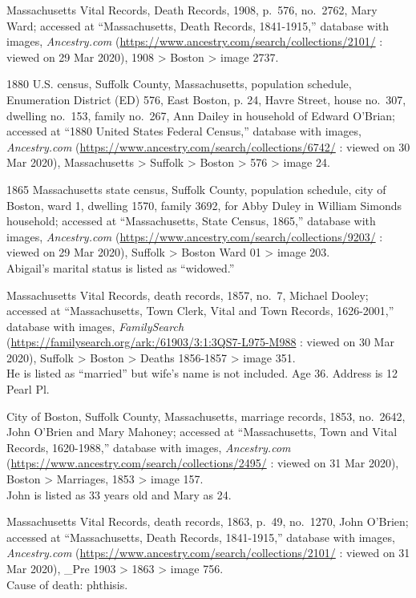 \begin{thebibliography}{999}
	Massachusetts Vital Records, Death Records, 1908, p.\ 576, no.\ 2762, Mary Ward; accessed at ``Massachusetts, Death Records, 1841-1915,'' database with images, \textit{Ancestry.com} (\url{https://www.ancestry.com/search/collections/2101/} : viewed on 29 Mar 2020), 1908 > Boston > image 2737.
	
	1880 U.S. census, Suffolk County, Massachusetts, population schedule, Enumeration District (ED) 576, East Boston, p. 24, Havre Street, house no.\ 307, dwelling no.\ 153, family no.\ 267, Ann Dailey in household of Edward O'Brian; accessed at ``1880 United States Federal Census,'' database with images, \textit{Ancestry.com} (\url{https://www.ancestry.com/search/collections/6742/} : viewed on 30 Mar 2020), Massachusetts > Suffolk > Boston > 576 > image 24.

	1865 Massachusetts state census, Suffolk County, population schedule, city of Boston, ward 1, dwelling 1570, family 3692, for Abby Duley in William Simonds household; accessed at ``Massachusetts, State Census, 1865,'' database with images, \textit{Ancestry.com} (\url{https://www.ancestry.com/search/collections/9203/} : viewed on 29 Mar 2020), Suffolk > Boston Ward 01 > image 203.\\
	Abigail's marital status is listed as ``widowed.''
	
	Massachusetts Vital Records, death records, 1857, no.\ 7, Michael Dooley; accessed at ``Massachusetts, Town Clerk, Vital and Town Records, 1626-2001,'' database with images, \textit{FamilySearch} (\url{https://familysearch.org/ark:/61903/3:1:3QS7-L975-M988} : viewed on 30 Mar 2020), Suffolk > Boston > Deaths 1856-1857 > image 351.\\
	He is listed as ``married'' but wife's name is not included. Age 36. Address is 12 Pearl Pl.
	
	City of Boston, Suffolk County, Massachusetts, marriage records, 1853, no.\ 2642, John O'Brien and Mary Mahoney; accessed at ``Massachusetts, Town and Vital Records, 1620-1988,'' database with images, \textit{Ancestry.com} (\url{https://www.ancestry.com/search/collections/2495/} : viewed on 31 Mar 2020), Boston > Marriages, 1853 > image 157.\\
	John is listed as 33 years old and Mary as 24.
	
	Massachusetts Vital Records, death records, 1863, p.\ 49, no.\ 1270, John O'Brien; accessed at ``Massachusetts, Death Records, 1841-1915,'' database with images, \textit{Ancestry.com} (\url{https://www.ancestry.com/search/collections/2101/} : viewed on 31 Mar 2020), \_Pre 1903 > 1863 > image 756.\\
	Cause of death: phthisis.
	

\end{thebibliography}

